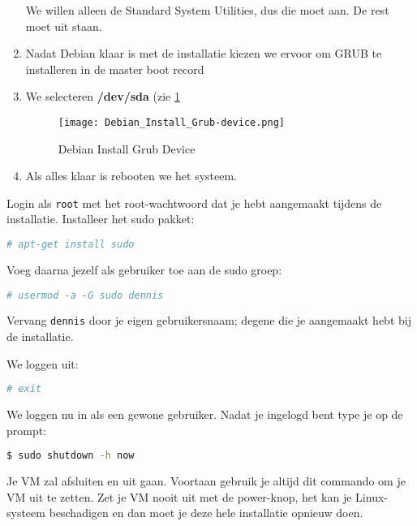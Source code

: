 \begin{enumerate}
We willen alleen de Standard System Utilities, dus die moet aan. De rest moet uit staan.

\item Nadat Debian klaar is met de installatie kiezen we ervoor om GRUB te installeren in de master boot record

\item We selecteren \textbf{/dev/sda} (zie \ref{DebGrubDev}
\begin{figure}[H]
	\centering
	\texttt{[image: Debian\_Install\_Grub-device.png]}
	\caption{Debian Install Grub Device}
	\label{DebGrubDev}
\end{figure}

\item Als alles klaar is rebooten we het systeem.
\end{enumerate}

Login als \texttt{root} met het root-wachtwoord dat je hebt aangemaakt tijdens de installatie. Installeer het sudo pakket:
\begin{lstlisting}[language=bash]
# apt-get install sudo
\end{lstlisting}

Voeg daarna jezelf als gebruiker toe aan de sudo groep:
\begin{lstlisting}[language=bash]
# usermod -a -G sudo dennis
\end{lstlisting}
Vervang \texttt{dennis} door je eigen gebruikersnaam; degene die je aangemaakt hebt bij de installatie.

We loggen uit:
\begin{lstlisting}[language=bash]
# exit
\end{lstlisting}

We loggen nu in als een gewone gebruiker. Nadat je ingelogd bent type je op de prompt:
\begin{lstlisting}[language=bash]
$ sudo shutdown -h now
\end{lstlisting}
Je VM zal afsluiten en uit gaan. Voortaan gebruik je altijd dit commando om je VM uit te zetten. Zet je VM nooit uit met de power-knop, het kan je Linux-systeem beschadigen en dan moet je deze hele installatie opnieuw doen.


